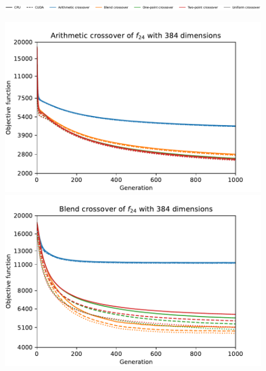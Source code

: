 \begin{figure}[ht!]
    \begin{minipage}{\textwidth}
        \centering
        \includegraphics[width=\textwidth]{img/runs/time_es_crossover_legend.pdf}
    \end{minipage}

    \caption[Running times of crossover operators]{}
\end{figure}


\begin{figure}[ht!]
    \begin{minipage}[t]{0.32\textwidth}
        \centering
        \includegraphics[width=\textwidth]{img/runs/fitness_es_crossover_f24_dim384_Arithmetic.pdf}
    \end{minipage}
    \hfill
    \begin{minipage}[t]{0.32\textwidth}
        \centering
        \includegraphics[width=\textwidth]{img/runs/fitness_es_crossover_f24_dim384_Blend.pdf}

\end{minipage}
\end{figure}
